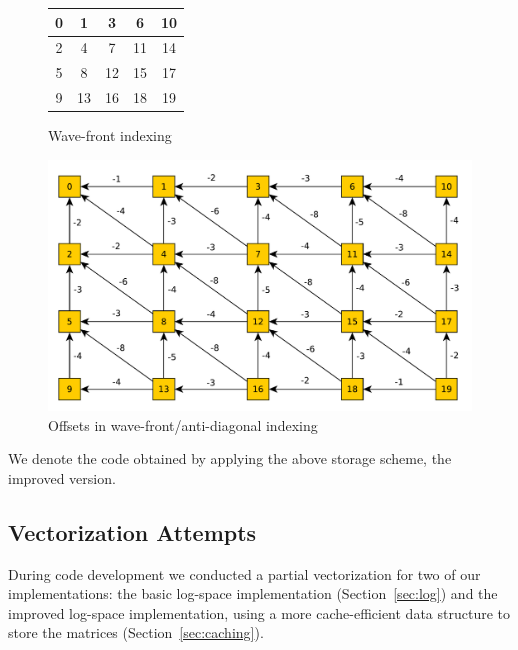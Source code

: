 \documentclass[runningheads,a4paper]{llncs}
\begin{document}
\begin{figure}
\begin{minipage}{0.5\textwidth}
\centering
\begin{tabular}{|c|c|c|c|c|}
\hline
0 & 1 & 3 & 6 & 10 \\
\hline
2 & 4 & 7 & 11 & 14 \\
\hline
5 & 8 & 12 & 15 & 17 \\
\hline
9 & 13 & 16 & 18 & 19 \\
\hline
\end{tabular}
\caption{Wave-front indexing}
\label{fig:wavefront}
\end{minipage}
\end{figure}

\begin{figure}
\centering
\includegraphics[scale=0.5]{images/unnamed0.pdf}
\caption{Offsets in wave-front/anti-diagonal indexing}
\label{fig:offset}
\end{figure}


We denote the code obtained by applying the above storage scheme, the improved version.

\subsection{Vectorization Attempts}
\label{sec:vector}
During code development we conducted a partial vectorization for two of our implementations:
the basic log-space implementation (Section~\ref{sec:log}) and the improved log-space implementation, using a more
cache-efficient data structure to store the matrices (Section~\ref{sec:caching}).
\end{document}
